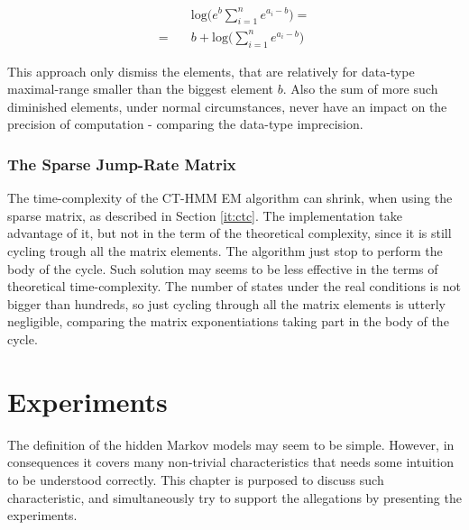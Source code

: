 \documentclass[thesis=M,english]{FITthesis}[2012/10/20]
\begin{document}
\begin{equation}\label{eq:logsum2}
\begin{aligned}
&\mathrm{log} \big( e^b \sum_{i=1}^n e^{a_i - b } \big) = \\
 = \quad &  b + \mathrm{log} \big( \sum_{i=1}^n e^{a_i - b } \big)
\end{aligned}
\end{equation}

This approach only dismiss the elements, that are relatively for data-type maximal-range smaller than the biggest element $b$. Also the sum of more such diminished elements, under normal circumstances, never have an impact on the precision of computation - comparing the data-type imprecision.     


\subsection{The Sparse Jump-Rate Matrix}

The time-complexity of the CT-HMM EM algorithm can shrink, when using the sparse matrix, as described in Section \ref{it:ctc}. The implementation take advantage of it, but not in the term of the theoretical complexity, since it is still cycling trough all the matrix elements. The algorithm just stop to perform the body of the cycle. Such solution may seems to be less effective in the terms of theoretical time-complexity. The number of states under the real conditions is not bigger than hundreds, so just cycling through all the matrix elements is utterly negligible, comparing the matrix exponentiations taking part in the body of the cycle.  


 
 
\chapter{Experiments}\label{ch:e}



The definition of the hidden Markov models may seem to be simple. However, in consequences it covers many non-trivial characteristics that needs some intuition to be understood correctly. This chapter is purposed to discuss such characteristic, and simultaneously try to support the allegations by presenting the experiments.
\end{document}
